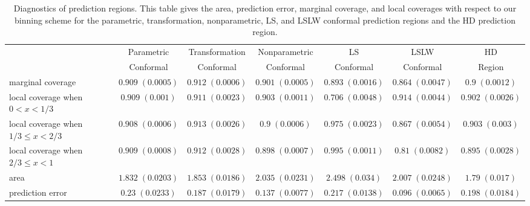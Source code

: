 \documentclass[11pt]{article}\usepackage[]{graphicx}\usepackage[]{color}
\begin{document}
\begin{table}[t!]
\tiny
\begin{center}
\begin{tabular}{lcccccc}
  & Parametric & Transformation & Nonparametric & LS        & LSLW      & HD     \\  
  & Conformal  & Conformal      & Conformal     & Conformal & Conformal & Region \\
    marginal coverage & 
  $0.909 \; (0.0005)$ & 
  $0.912 \; (0.0006)$ & 
  $0.901 \; (0.0005)$ & 
  $0.893 \; (0.0016)$ & 
  $0.864 \; (0.0047)$ &
  $0.9 \; (0.0012)$ \\ 
    local coverage when $0 < x < 1/3$ & 
  $0.909 \; (0.001)$ & 
  $0.911 \; (0.0023)$ & 
  $0.903 \; (0.0011)$ & 
  $0.706 \; (0.0048)$ & 
  $0.914 \; (0.0044)$ &
  $0.902 \; (0.0026)$ \\
    local coverage when $1/3 \leq x < 2/3$ & 
  $0.908 \; (0.0006)$ & 
  $0.913 \; (0.0026)$ & 
  $0.9 \; (0.0006)$ & 
  $0.975 \; (0.0023)$ & 
  $0.867 \; (0.0054)$ &
  $0.903 \; (0.003)$ \\
    local coverage when $2/3 \leq x < 1$ & 
  $0.909 \; (0.0008)$ & 
  $0.912 \; (0.0028)$ & 
  $0.898 \; (0.0007)$ & 
  $0.995 \; (0.0011)$ & 
  $0.81 \; (0.0082)$ & 
  $0.895 \; (0.0028)$ \\
    area & 
  $1.832 \; (0.0203)$ & 
  $1.853 \; (0.0186)$ & 
  $2.035 \; (0.0231)$ & 
  $2.498 \; (0.034)$ & 
  $2.007 \; (0.0248)$ & 
  $1.79 \; (0.017)$ \\
    prediction error & 
  $0.23 \; (0.0233)$ & 
  $0.187 \; (0.0179)$ & 
  $0.137 \; (0.0077)$ & 
  $0.217 \; (0.0138)$ & 
  $0.096 \; (0.0065)$ & 
  $0.198 \; (0.0184)$ 
\end{tabular}
\end{center}
\caption{Diagnostics of prediction regions. This table gives 
    the area, prediction error, marginal coverage, and local coverages with 
    respect to our binning scheme for the parametric, transformation, 
    nonparametric, LS, and LSLW conformal prediction regions and the HD 
    prediction region.}
\label{Tab:gamma-results}
\end{table}
\end{document}

